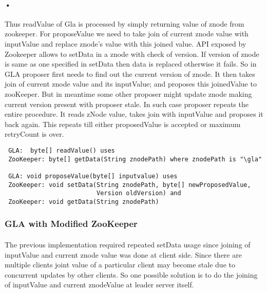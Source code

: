 \documentclass[a4paper,12pt]{report}
\begin{document}
\paragraph{•}
 Thus readValue of Gla is processed by simply returning value of znode from zookeeper.
 For proposeValue we need to take join of current znode value with inputValue and replace znode's value with this joined value. API exposed by Zookeeper allows to setData in a znode with check of version. If version of znode is same as one specified in setData then data is replaced otherwise it fails. 
So in GLA proposer first needs to find out the current version of znode. It then takes join of current znode value and its inputValue; and proposes this joinedValue to zooKeeper. But in meantime some other proposer might update znode making current version present with proposer stale.
In such case proposer repeats the entire procedure. It reads zNode value, takes join with inputValue and proposes it back again. This repeats till either proposedValue is accepted or maximum retryCount is over. 
 
 \begin{verbatim}
 GLA:  byte[] readValue() uses
 ZooKeeper: byte[] getData(String znodePath) where znodePath is "\gla"  

 GLA: void proposeValue(byte[] inputvalue) uses
 ZooKeeper: void setData(String znodePath, byte[] newProposedValue,
 						 Version oldVersion) and
 ZooKeeper: void getData(String znodePath)
 \end{verbatim}
 

\subsubsection{GLA with Modified ZooKeeper}
\paragraph{}
The previous implementation required repeated setData usage since joining of inputValue and current znode value was done at client side. Since there are multiple clients joint value of a particular client  may become stale due to concurrent updates by other clients. So one possible solution is to do the joining of inputValue and current znodeValue at leader server itself. 
\end{document}
